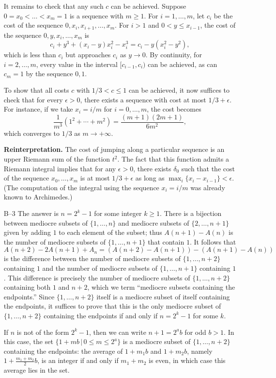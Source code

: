 \documentclass[amssymb,twocolumn,pra,10pt,aps]{revtex4-1}
\begin{document}
\begin{itemize}
It remains to check that any such $c$ can be achieved.
Suppose $0 = x_0 < \dots < x_m = 1$ is a sequence with $m \geq 1$.
For $i=1,\dots,m$,
let $c_i$ be the cost of the sequence $0, x_i, x_{i+1},\dots,x_m$.
For $i > 1$ and $0 < y \leq x_{i-1}$,
the cost of the sequence $0, y, x_{i}, \dots, x_m$
is
\[
c_{i} + y^3 + (x_i - y)x_i^2 - x_i^3
= c_i - y(x_i^2 - y^2),
\]
which is less than $c_i$ but approaches $c_i$ as $y \to 0$.
By continuity, for $i=2,\dots,m$,
every value in the interval $[c_{i-1}, c_{i})$ can be achieved,
as can $c_m = 1$ by the sequence $0,1$.

To show that all costs $c$ with $1/3 < c \leq 1$ can be achieved, it now suffices
to check that for every $\epsilon > 0$, there exists a sequence with cost at most
$1/3 + \epsilon$. For instance, if we take $x_i = i/m$ for $i=0,\dots,m$, the cost
becomes
\[
\frac{1}{m^3} (1^2 + \cdots + m^2)
 = \frac{(m+1)(2m+1)}{6m^2},
\]
which converges to $1/3$ as $m \to +\infty$.

\textbf{Reinterpretation.} The cost of jumping along a particular sequence is an
upper Riemann sum of the function $t^2$. The fact that this function admits a Riemann
integral implies that for any $\epsilon > 0$, there exists $\delta_0$ such that the
cost of the sequence $x_0,\dots,x_m$ is at most $1/3 + \epsilon$ as long as
$\max_i \{x_i - x_{i-1}\} < \epsilon$. (The computation of the integral using the
sequence $x_i = i/m$ was already known to Archimedes.)

\item[B--3]
The answer is $n=2^k-1$ for some integer $k\geq 1$.
There is a bijection between mediocre subsets of $\{1,\ldots,n\}$ and
mediocre subsets of $\{2,\ldots,n+1\}$ given by adding $1$ to each
element of the subset; thus $A(n+1)-A(n)$ is the number of mediocre
subsets of $\{1,\ldots,n+1\}$ that contain $1$. It follows that
$A(n+2)-2A(n+1)+A_n = (A(n+2)-A(n+1))-(A(n+1)-A(n))$ is the difference
between the number of mediocre subsets of $\{1,\ldots,n+2\}$ containing
$1$ and the number of mediocre subsets of $\{1,\ldots,n+1\}$ containing
$1$. This difference is precisely the number of mediocre subsets of
$\{1,\ldots,n+2\}$ containing both $1$ and $n+2$, which we term
``mediocre subsets containing the endpoints.'' Since $\{1,\ldots,n+2\}$
itself is a mediocre subset of itself containing the endpoints, it
suffices to prove that this is the only mediocre subset of
$\{1,\ldots,n+2\}$ containing the endpoints if and only if $n=2^k-1$ for
some $k$.

If $n$ is not of the form $2^k-1$, then we can write $n+1 = 2^a b$ for
odd $b>1$. In this case, the set $\{1+m b \, | \, 0 \leq m \leq 2^a\}$
is a mediocre subset of $\{1,\ldots,n+2\}$ containing the endpoints: the
average of $1+m_1 b$ and $1+m_2 b$, namely $1+\frac{m_1+m_2}{2} b$, is
an integer if and only if $m_1+m_2$ is even, in which case this average
lies in the set.


\end{itemize}
\end{document}
